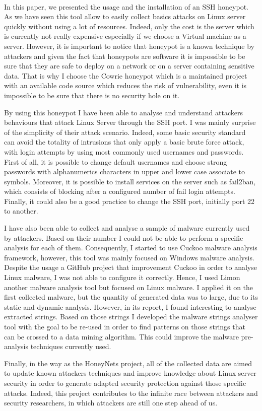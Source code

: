 \paragraph{}

In this paper, we presented the usage and the installation of an SSH honeypot. As we have 
seen this tool allow to easily collect basics attacks on Linux server quickly without
using a lot of resources. Indeed, only the cost is the server which is currently not really
expensive especially if we choose a Virtual machine as a server.
However, it is important to notice that honeypot is a known technique by attackers and
given the fact that honeypots are software it is impossible to be sure that they are safe
to deploy on a network or on a server containing sensitive data. That is why I choose the
Cowrie honeypot which is a maintained project with an available code source which reduces 
the risk of vulnerability, even it is impossible to be sure that there is no security hole
on it.

By using this honeypot I have been able to analyse and understand attackers behaviours that
attack Linux Server through the SSH port. I was mainly surprise of the simplicity of their
attack scenario. Indeed, some basic security standard can avoid the totality of intrusions
that only apply a basic brute force attack, with login attempts by using most commonly used
usernames and passwords. First of all, it is possible to change default usernames and choose
strong passwords with alphanumerics characters in upper and lower case associate to symbols.
Moreover, it is possible to install services on the server such as fail2ban, which consists
of blocking after a configured number of fail login attempts. Finally, it could also be a good
practice to change the SSH port, initially port 22 to another.

I have also been able to collect and analyse a sample of malware currently used by attackers.
Based on their number I could not be able to perform a specific analysis for each of them.
Consequently, I started to use Cuckoo malware analysis framework, however, this tool was
mainly focused on Windows malware analysis. Despite the usage a GitHub project that 
improvement Cuckoo in order to analyse Linux malware, I was not able to configure it correctly.
Hence, I used Limon another malware analysis tool but focused on Linux malware. I applied
it on the first collected malware, but the quantity of generated data was to large, due
to its static and dynamic analysis. However, in its report, I found interesting to analyse
extracted strings.
Based on those strings I developed the malware strings analyser tool with the goal to be 
re-used in order to find patterns on those strings that can be crossed to a data mining 
algorithm. This could improve the malware pre-analysis techniques currently used.

Finally, in the way as the HoneyNets project, all of the collected data are aimed to update
known attackers techniques and improve knowledge about Linux server security in order
to generate adapted security protection against those specific attacks.
Indeed, this project contributes to the infinite race between attackers and security researchers,
in which attackers are still one step ahead of us.

\newpage